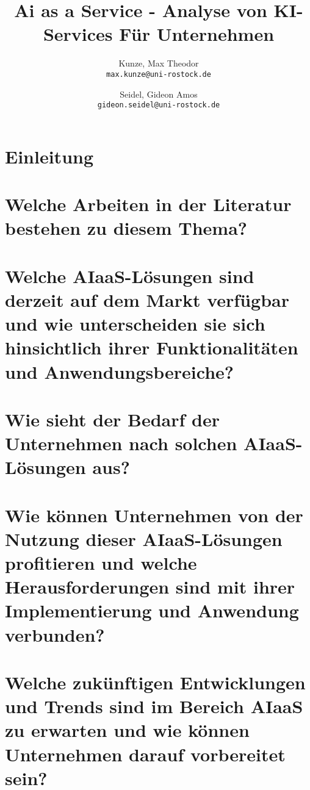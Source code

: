 \documentclass{article}
\author{
	Kunze, Max Theodor\\
	\texttt{max.kunze@uni-rostock.de}
	\and
	Seidel, Gideon Amos \\
	\texttt{gideon.seidel@uni-rostock.de}
	}
\title{Ai as a Service - Analyse von KI-Services Für Unternehmen}
\begin{document}
\maketitle
\newpage
\tableofcontents
\newpage
\section*{Einleitung}
\lipsum[1-3]

\section*{Welche Arbeiten in der Literatur bestehen zu diesem Thema?}

\section*{Welche AIaaS-Lösungen sind derzeit auf dem Markt verfügbar und wie unterscheiden sie sich
hinsichtlich ihrer Funktionalitäten und Anwendungsbereiche?}

\section*{Wie sieht der Bedarf der Unternehmen nach solchen AIaaS-Lösungen aus?}

\section*{Wie können Unternehmen von der Nutzung dieser AIaaS-Lösungen profitieren und welche Herausforderungen sind mit ihrer Implementierung und Anwendung verbunden?}


\section*{Welche zukünftigen Entwicklungen und Trends sind im Bereich AIaaS zu erwarten und wie können Unternehmen darauf vorbereitet sein?}
\end{document}
